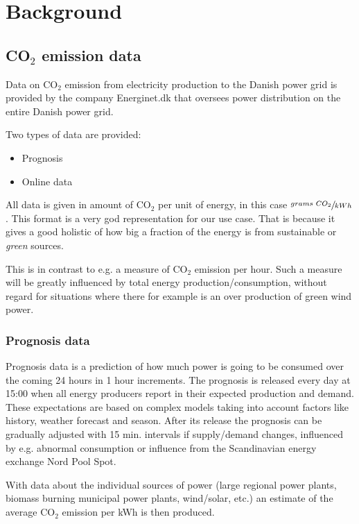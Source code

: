 \documentclass[Main]{subfiles}
\begin{document}
\section{Background} %
\label{sec:background}

	\subsection{CO$_2$ emission data} %
	\label{sub:c02_emission_data}

		Data on CO$_2$ emission from electricity production to the Danish power grid is provided by the company Energinet.dk that oversees power distribution on the entire Danish power grid.

		Two types of data are provided:
		\begin{itemize}
			\item Prognosis
			\item Online data
		\end{itemize}

		All data is given in amount of CO$_2$ per unit of energy, in this case 
		$\sfrac{grams\ CO_2}{kWh}$.
		This format is a very god representation for our use case.
		That is because it gives a good holistic of how big a fraction of the energy is from sustainable or \emph{green} sources.
		
		This is in contrast to e.g. a measure of CO$_2$ emission per hour.
		Such a measure will be greatly influenced by total energy production/consumption, without regard for situations where there for example is an over production of green wind power.


		\subsubsection{Prognosis data} %
		\label{sub:prognosis}
			Prognosis data is a prediction of how much power is going to be consumed over the coming 24 hours in 1 hour increments.
			The prognosis is released every day at 15:00 when all energy producers report in their expected production and demand.
			These expectations are based on complex models taking into account factors like history, weather forecast and season.
			After its release the prognosis can be gradually adjusted with 15 min. intervals if supply/demand changes, influenced by e.g. abnormal consumption or influence from the Scandinavian energy exchange Nord Pool Spot.

			With data about the individual sources of power (large regional power plants, biomass burning municipal power plants, wind/solar, etc.) an estimate of the average CO$_2$ emission per kWh is then produced.
\end{document}
